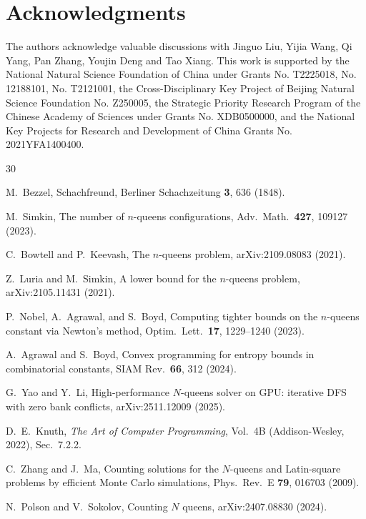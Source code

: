 \documentclass[aps, pre, reprint, amsmath, amssymb, superscriptaddress, floatfix]{revtex4-2}
\begin{document}
\section{Acknowledgments}
The authors acknowledge valuable discussions with Jinguo Liu, Yijia Wang, Qi Yang, Pan Zhang, Youjin Deng and Tao Xiang. This work is supported by the National Natural Science Foundation of China under Grants No. T2225018, No. 12188101, No. T2121001, the Cross-Disciplinary Key Project of Beijing Natural Science Foundation No. Z250005, the Strategic Priority Research Program of the Chinese Academy of Sciences under Grants No. XDB0500000, and the National Key Projects for Research and Development of China Grants No. 2021YFA1400400. 


\begin{thebibliography}{30}

M.~Bezzel,
Schachfreund, Berliner Schachzeitung \textbf{3}, 636 (1848).

M.~Simkin,
The number of $n$-queens configurations,
Adv.\ Math.\ \textbf{427}, 109127 (2023).

C.~Bowtell and P.~Keevash,
The $n$-queens problem,
arXiv:2109.08083 (2021).

Z.~Luria and M.~Simkin,
A lower bound for the $n$-queens problem,
arXiv:2105.11431 (2021).

P.~Nobel, A.~Agrawal, and S.~Boyd,
Computing tighter bounds on the $n$-queens constant via Newton's method,
Optim.\ Lett.\ \textbf{17}, 1229--1240 (2023).

A.~Agrawal and S.~Boyd,
Convex programming for entropy bounds in combinatorial constants,
SIAM Rev.\ \textbf{66}, 312 (2024).

G.~Yao and Y.~Li,
High-performance $N$-queens solver on GPU: iterative DFS with zero
bank conflicts,
arXiv:2511.12009 (2025).

D.~E.~Knuth,
\textit{The Art of Computer Programming}, Vol.~4B
(Addison-Wesley, 2022), Sec.~7.2.2.

C.~Zhang and J.~Ma,
Counting solutions for the $N$-queens and Latin-square problems by
efficient Monte Carlo simulations,
Phys.\ Rev.\ E \textbf{79}, 016703 (2009).

N.~Polson and V.~Sokolov,
Counting $N$ queens,
arXiv:2407.08830 (2024).


\end{thebibliography}
\end{document}
